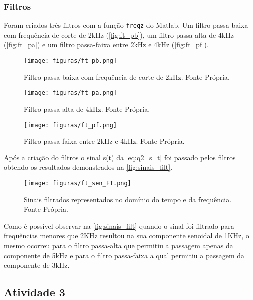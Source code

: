 \documentclass[11pt]{classes/ifscarticle}
\begin{document}
\subsubsection{Filtros}
Foram criados três filtros com a função \texttt{freqz} do Matlab. Um filtro passa-baixa com frequência de corte de 2kHz (\autoref{fig:ft_pb}), um filtro passa-alta de 4kHz (\autoref{fig:ft_pa}) e um filtro passa-faixa entre 2kHz e 4kHz (\autoref{fig:ft_pf}).

\begin{figure}[ht]
    \centering
    \texttt{[image: figuras/ft\_pb.png]}
    \caption{Filtro passa-baixa com frequência de corte de 2kHz. Fonte Própria.}
    \label{fig:ft_pb}
\end{figure}

\begin{figure}[ht]
    \centering
    \texttt{[image: figuras/ft\_pa.png]}
    \caption{Filtro passa-alta de 4kHz. Fonte Própria.}
    \label{fig:ft_pa}
\end{figure}

\begin{figure}[ht]
    \centering
    \texttt{[image: figuras/ft\_pf.png]}
    \caption{Filtro passa-faixa entre 2kHz e 4kHz. Fonte Própria.}
    \label{fig:ft_pf}
\end{figure}

Após a criação do filtros o sinal s(t) da \autoref{eq:q2_s_t} foi passado pelos filtros obtendo os resultados demonstrados na \autoref{fig:sinais_filt}.  

\begin{figure}[ht]
    \centering
    \texttt{[image: figuras/ft\_sen\_FT.png]}
    \caption{Sinais filtrados representados no domínio do tempo e da frequência. Fonte Própria.}
    \label{fig:sinais_filt}
\end{figure}

\newpage
Como é possível observar na \autoref{fig:sinais_filt} quando o sinal foi filtrado para frequências menores que 2KHz resultou na sua componente senoidal de 1KHz, o mesmo ocorreu para o filtro passa-alta que permitiu a passagem apenas da componente de 5kHz e para o filtro passa-faixa a qual permitiu a passagem da componente de 3kHz.

\newpage


\subsection{Atividade 3}
\label{sec:A3}
\end{document}
